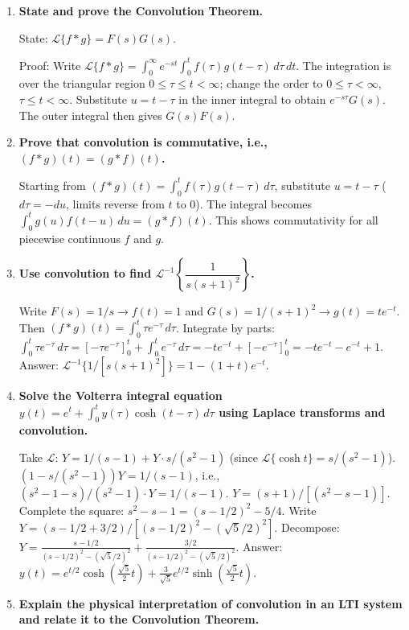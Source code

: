 \documentclass[12pt,a4paper]{article}
\begin{document}
\begin{enumerate}[label=\textbf{\arabic*.}, leftmargin=*, itemsep=10pt]

\item \textbf{State and prove the Convolution Theorem.}

State: $\mathcal{L}\{f*g\} = F(s)G(s)$.

Proof: Write $\mathcal{L}\{f*g\} = \int_0^\infty e^{-st}\int_0^t f(\tau)g(t-\tau)\,d\tau\,dt$.
The integration is over the triangular region $0\leq\tau\leq t<\infty$;
change the order to $0\leq\tau<\infty$, $\tau\leq t<\infty$.
Substitute $u = t-\tau$ in the inner integral to obtain $e^{-s\tau}G(s)$.
The outer integral then gives $G(s)F(s)$.

\item \textbf{Prove that convolution is commutative, i.e., $(f*g)(t) = (g*f)(t)$.}

Starting from $(f*g)(t) = \int_0^t f(\tau)g(t-\tau)\,d\tau$, substitute
$u = t-\tau$ ($d\tau = -du$, limits reverse from $t$ to $0$).
The integral becomes $\int_0^t g(u)f(t-u)\,du = (g*f)(t)$.
This shows commutativity for all piecewise continuous $f$ and $g$.

\item \textbf{Use convolution to find $\mathcal{L}^{-1}\!\left\{\dfrac{1}{s(s+1)^2}\right\}$.}

Write $F(s) = 1/s \to f(t) = 1$ and $G(s) = 1/(s+1)^2 \to g(t) = te^{-t}$.
Then $(f*g)(t) = \int_0^t \tau e^{-\tau}\,d\tau$.
Integrate by parts: $\int_0^t\tau e^{-\tau}\,d\tau = [-\tau e^{-\tau}]_0^t + \int_0^t e^{-\tau}\,d\tau
= -te^{-t} + [-e^{-\tau}]_0^t = -te^{-t} - e^{-t} + 1$.
Answer: $\mathcal{L}^{-1}\{1/[s(s+1)^2]\} = 1 - (1+t)e^{-t}$.

\item \textbf{Solve the Volterra integral equation
$y(t) = e^t + \int_0^t y(\tau)\cosh(t-\tau)\,d\tau$ using Laplace transforms and convolution.}

Take $\mathcal{L}$: $Y = 1/(s-1) + Y \cdot s/(s^2-1)$ (since
$\mathcal{L}\{\cosh t\} = s/(s^2-1)$).
$(1 - s/(s^2-1))Y = 1/(s-1)$, i.e.,
$(s^2-1-s)/(s^2-1)\cdot Y = 1/(s-1)$.
$Y = (s+1)/[(s^2-s-1)]$.
Complete the square: $s^2-s-1 = (s-1/2)^2-5/4$.
Write $Y = (s-1/2+3/2)/[(s-1/2)^2-({\sqrt{5}}/2)^2]$.
Decompose: $Y = \frac{s-1/2}{(s-1/2)^2-(\sqrt{5}/2)^2} + \frac{3/2}{(s-1/2)^2-(\sqrt{5}/2)^2}$.
Answer: $y(t) = e^{t/2}\cosh(\tfrac{\sqrt{5}}{2}t) + \tfrac{3}{\sqrt{5}}e^{t/2}\sinh(\tfrac{\sqrt{5}}{2}t)$.

\item \textbf{Explain the physical interpretation of convolution in an LTI system and relate it to the Convolution Theorem.}


\end{enumerate}
\end{document}
